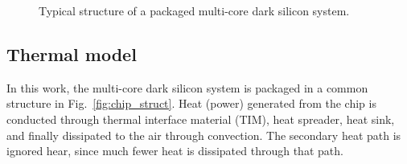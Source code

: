\begin{figure}
  \centering
\caption{Typical structure of a
    packaged multi-core dark silicon system.}
\end{figure}

\subsection{Thermal model}\label{sec:therm_model}
In this work, the multi-core dark silicon system is packaged in a common structure in Fig.~\ref{fig:chip_struct}. 
Heat (power) generated from the chip is conducted through thermal interface material (TIM), heat spreader, heat sink, and finally dissipated to the air through convection. The secondary heat path is ignored hear, since much fewer heat is dissipated through that path.

